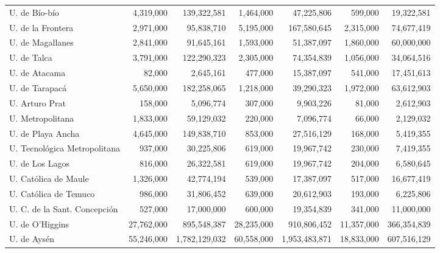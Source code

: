 \begin{tabular}{l rr rr rr}
U. de Bío-bío                  &     4,319,000 &     139,322,581 &     1,464,000 &      47,225,806 &       599,000 &      19,322,581 \\
U. de la Frontera              &     2,971,000 &      95,838,710 &     5,195,000 &     167,580,645 &     2,315,000 &      74,677,419 \\
U. de Magallanes               &     2,841,000 &      91,645,161 &     1,593,000 &      51,387,097 &     1,860,000 &      60,000,000 \\
U. de Talca                    &     3,791,000 &     122,290,323 &     2,305,000 &      74,354,839 &     1,056,000 &      34,064,516 \\
U. de Atacama                  &        82,000 &       2,645,161 &       477,000 &      15,387,097 &       541,000 &      17,451,613 \\
U. de Tarapacá                 &     5,650,000 &     182,258,065 &     1,218,000 &      39,290,323 &     1,972,000 &      63,612,903 \\
U. Arturo Prat                 &       158,000 &       5,096,774 &       307,000 &       9,903,226 &        81,000 &       2,612,903 \\
U. Metropolitana               &     1,833,000 &      59,129,032 &       220,000 &       7,096,774 &        66,000 &       2,129,032 \\
U. de Playa Ancha              &     4,645,000 &     149,838,710 &       853,000 &      27,516,129 &       168,000 &       5,419,355 \\
U. Tecnológica Metropolitana   &       937,000 &      30,225,806 &       619,000 &      19,967,742 &       230,000 &       7,419,355 \\
U. de Los Lagos                &       816,000 &      26,322,581 &       619,000 &      19,967,742 &       204,000 &       6,580,645 \\
U. Católica de Maule           &     1,326,000 &      42,774,194 &       539,000 &      17,387,097 &       517,000 &      16,677,419 \\
U. Católica de Temuco          &       986,000 &      31,806,452 &       639,000 &      20,612,903 &       193,000 &       6,225,806 \\
U. C. de la Sant. Concepción   &       527,000 &      17,000,000 &       600,000 &      19,354,839 &       341,000 &      11,000,000 \\
U. de O'Higgins                &    27,762,000 &     895,548,387 &    28,235,000 &     910,806,452 &    11,357,000 &     366,354,839 \\
U. de Aysén                    &    55,246,000 &   1,782,129,032 &    60,558,000 &   1,953,483,871 &    18,833,000 &     607,516,129 \\
\hline
\end{tabular}
